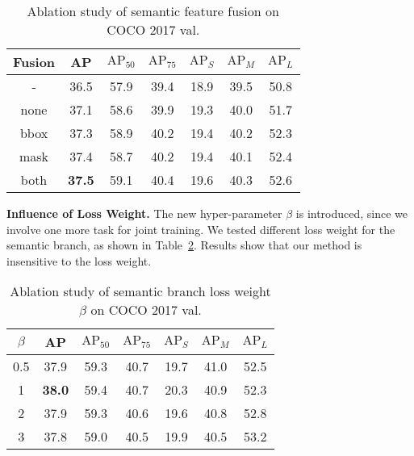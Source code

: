 \documentclass[10pt,twocolumn,letterpaper]{article}
\begin{document}
\begin{table}[htb]
	\centering
	\caption{Ablation study of semantic feature fusion on COCO 2017 val.}
	\addtolength{\tabcolsep}{-2pt}
	\begin{tabular}{*{7}{c}}
		\toprule
		Fusion & AP   & $\text{AP}_{50}$ & $\text{AP}_{75}$ & $\text{AP}_{S}$ & $\text{AP}_{M}$ & $\text{AP}_{L}$ \\
		\midrule
		-             & 36.5 & 57.9 & 39.4 & 18.9 & 39.5 & 50.8 \\
		none          & 37.1 & 58.6 & 39.9 & 19.3 & 40.0 & 51.7 \\
		bbox          & 37.3 & 58.9 & 40.2 & 19.4 & 40.2 & 52.3 \\
		mask          & 37.4 & 58.7 & 40.2 & 19.4 & 40.1 & 52.4 \\
		both          & \textbf{37.5} & 59.1 & 40.4 & 19.6 & 40.3 & 52.6 \\
		\bottomrule
	\end{tabular}
	\vspace{-0.3cm}
	\label{tab:semantic}
\end{table}

\noindent\textbf{Influence of Loss Weight.}
The new hyper-parameter $\beta$ is introduced, since we involve one more task for joint training.
We tested different loss weight for the semantic branch, as shown in Table~\ref{tab:loss-weight}.
Results show that our method is insensitive to the loss weight.

\begin{table}[htb]
	\centering
	\caption{Ablation study of semantic branch loss weight $\beta$ on COCO 2017 val.}
	\addtolength{\tabcolsep}{-2pt}
	\begin{tabular}{*{7}{c}}
		\toprule
		$\beta$ & AP & $\text{AP}_{50}$ & $\text{AP}_{75}$ & $\text{AP}_{S}$ & $\text{AP}_{M}$ & $\text{AP}_{L}$ \\
		\midrule
		0.5     &37.9&       59.3       &      40.7        &      19.7       &      41.0       &       52.5      \\
		1       &\textbf{38.0}&       59.4       &      40.7        &      20.3       &      40.9       &       52.3      \\
		2       &37.9&       59.3       &      40.6        &      19.6       &      40.8       &       52.8      \\
		3       &37.8&       59.0       &      40.5        &      19.9       &      40.5       &       53.2      \\
		\bottomrule
	\end{tabular}
	\label{tab:loss-weight}
\end{table}
\end{document}
